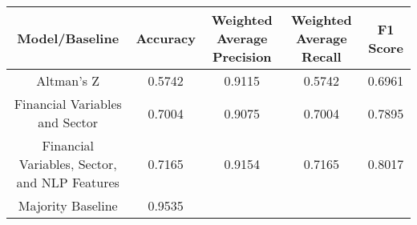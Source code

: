 \footnotesize
\begin{tabular}{ccccc}
\toprule
Model/Baseline & Accuracy & Weighted Average Precision & Weighted Average Recall & F1 Score \\
\midrule
Altman's Z & 0.5742 & 0.9115 & 0.5742 & 0.6961 \\
Financial Variables and Sector & 0.7004 & 0.9075 & 0.7004 & 0.7895 \\
Financial Variables, Sector, and NLP Features & 0.7165 & 0.9154 & 0.7165 & 0.8017 \\
Majority Baseline & 0.9535 &  &  &  \\
\bottomrule
\end{tabular}

\normalsize